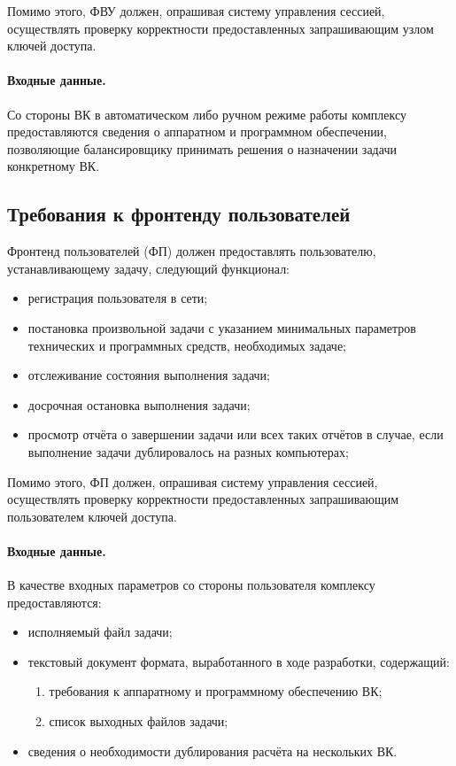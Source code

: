 \documentclass[a4paper,12pt]{report}
\numberwithin{equation}{section}
\begin{document}
Помимо этого, ФВУ должен, опрашивая систему управления сессией, осуществлять проверку корректности предоставленных запрашивающим узлом ключей доступа.

\paragraph{Входные данные.}
Со стороны ВК в автоматическом либо ручном режиме работы комплексу предоставляются сведения о аппаратном и программном обеспечении, 
позволяющие балансировщику принимать решения о назначении задачи конкретному ВК.


\subsection{Требования к фронтенду пользователей}
Фронтенд пользователей (ФП) должен предоставлять пользователю, устанавливающему задачу, следующий функционал:

\begin{itemize}
    \item регистрация пользователя в сети;
    \item постановка произвольной задачи с указанием минимальных параметров технических и программных средств, необходимых задаче;
    \item отслеживание состояния выполнения задачи;
    \item досрочная остановка выполнения задачи;
    \item просмотр отчёта о завершении задачи или всех таких отчётов в случае, если выполнение задачи дублировалось на разных компьютерах;
\end{itemize}
Помимо этого, ФП должен, опрашивая систему управления сессией, осуществлять проверку корректности предоставленных запрашивающим пользователем ключей доступа.


\paragraph{Входные данные.}
В качестве входных параметров со стороны пользователя комплексу предоставляются:
\begin{itemize}
    \item исполняемый файл задачи;
    \item текстовый документ формата, выработанного в ходе разработки, содержащий: 
    \begin{enumerate}
        \item требования к аппаратному и программному обеспечению ВК;
        \item список выходных файлов задачи;
    \end{enumerate}
    \item сведения о необходимости дублирования расчёта на нескольких ВК.
\end{itemize}
\end{document}
